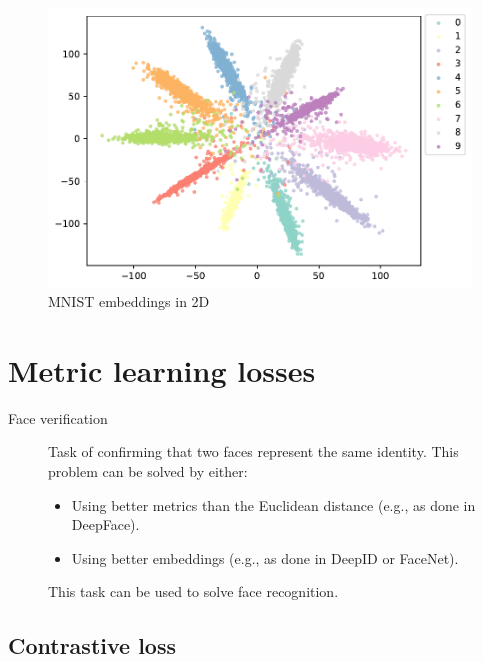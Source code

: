 \begin{description}
\begin{remark}
            \begin{figure}[H]
                \centering
                \includegraphics[width=0.45\linewidth]{./img/_mnist_embeddings.pdf}
                \caption{MNIST embeddings in 2D}
            \end{figure}
        \end{remark}
\end{description}



\section{Metric learning losses}

\begin{description}
    \item[Face verification] 
        Task of confirming that two faces represent the same identity. This problem can be solved by either:
        \begin{itemize}
            \item Using better metrics than the Euclidean distance (e.g., as done in DeepFace).
            \item Using better embeddings (e.g., as done in DeepID or FaceNet).
        \end{itemize}

        \begin{remark}
            This task can be used to solve face recognition.
        \end{remark}
\end{description}


\subsection{Contrastive loss}

